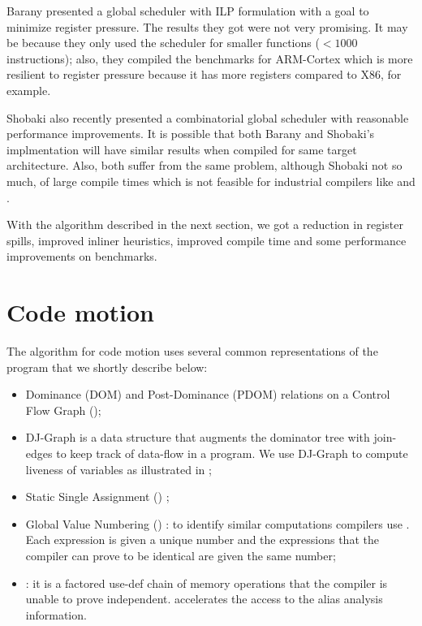 \documentclass[acmlarge,review,anonymous]{acmart}\settopmatter{printfolios=true}
\begin{document}
Barany \cite{barany2013} presented a global scheduler with ILP formulation with
a goal to minimize register pressure. The results they got were not very
promising. It may be because they only used the scheduler for smaller functions
($<1000$ instructions); also, they compiled the benchmarks for ARM-Cortex which
is more resilient to register pressure because it has more registers compared to
X86, for example.

Shobaki \cite{shobaki2013} also recently presented a combinatorial global
scheduler with reasonable performance improvements. It is possible that both
Barany and Shobaki's implmentation will have similar results when compiled for
same target architecture. Also, both suffer from the same problem, although
Shobaki not so much, of large compile times which is not feasible for industrial
compilers like \GCC{} and \LLVM{}.

With the algorithm described in the next section, we got a reduction in register
spills, improved inliner heuristics, improved compile time and some performance
improvements on \SPEC{} benchmarks.


\section{Code motion}

The algorithm for code motion uses several common representations of the
program that we shortly describe below:
\begin{itemize}
\item Dominance (DOM) and Post-Dominance (PDOM) relations \cite{dragonbook} on a
  Control Flow Graph (\CFG{});
\item DJ-Graph \cite{Sreedhar1996} is a data structure that augments the
  dominator tree with join-edges to keep track of data-flow in a program. We use
  DJ-Graph to compute liveness of variables as illustrated in \cite{das2012};
\item Static Single Assignment (\SSA{}) \cite{cytron};
\item Global Value Numbering (\GVN{}) \cite{rosen1988global,click1995global}: to
  identify similar computations compilers use \GVN{}.  Each expression is given
  a unique number and the expressions that the compiler can prove to be
  identical are given the same number;
\item \MemorySSA{} \cite{novillo2007memory}: it is a factored use-def chain of
  memory operations that the compiler is unable to prove
  independent. \MemorySSA{} accelerates the access to the alias analysis
  information.
\end{itemize}
\end{document}
